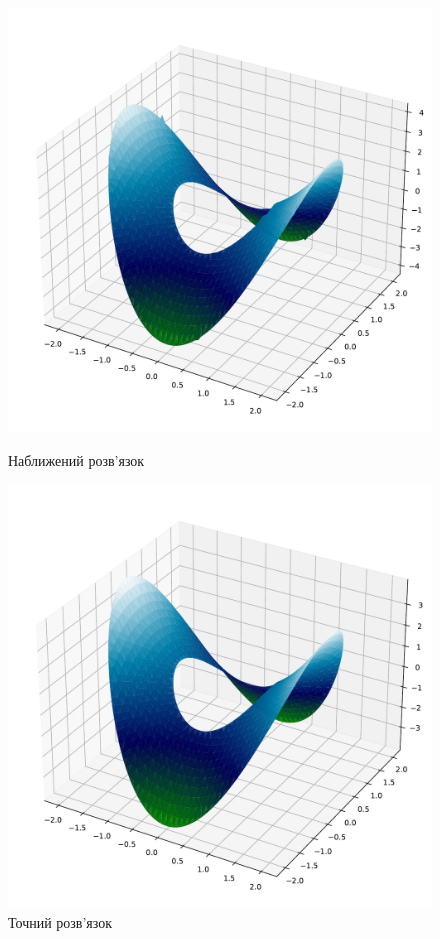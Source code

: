 \documentclass[14pt,a4paper]{extarticle}
\newcounter{e}
\numberwithin{equation}{section}
\numberwithin{figure}{section}
\begin{document}
 \begin{figure}[!htb]
	 \includegraphics[width=1\textwidth]{resources/ex2-approx.pdf}
	 \caption{Наближений розв'язок}
	\label{fig:ex2-approx}
	 \endminipage
 	\includegraphics[width=1\textwidth]{resources/ex2-ex.pdf}
 	\caption{Точний розв'язок}	
	\label{fig:ex2-exact}
 	\endminipage\hfill
 \end{figure}
\end{document}

